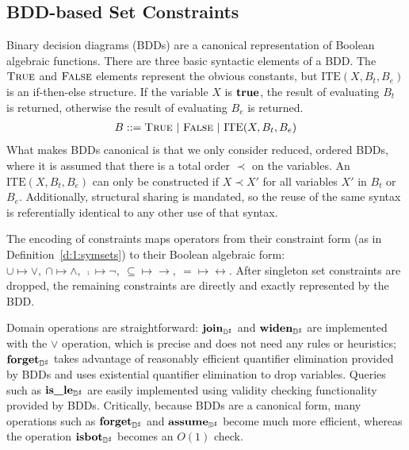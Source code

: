 \subsection{BDD-based Set Constraints}
\label{s:4:3:bdd}
Binary decision diagrams (BDDs) are a canonical representation of Boolean algebraic functions.  There are three basic syntactic elements of a BDD.  The $\textsc{True}$ and $\textsc{False}$ elements represent the obvious constants, but $\textrm{ITE}(X,B_t,B_e)$ is an if-then-else structure.  If the variable $X$ is $\mathbf{true}$, the result of evaluating $B_t$ is returned, otherwise the result of evaluating $B_e$ is returned.
\begin{align*}
  B ::= \textsc{True} \ | \ \textsc{False} \ | \ \textrm{ITE}(X,B_t,B_e)
\end{align*}
What makes BDDs canonical is that we only consider reduced, ordered BDDs, where it is assumed that there is a total order $\prec$ on the variables.  An $\textrm{ITE}(X,B_t,B_e)$ can only be constructed if $X \prec X'$ for all variables $X'$ in $B_t$ or $B_e$.  Additionally, structural sharing is mandated, so the reuse of the same syntax is referentially identical to any other use of that syntax.

The encoding of constraints maps operators from their constraint form (as in Definition~\ref{d:1:symsets}) to their Boolean algebraic form: $\cup \mapsto \vee, \ \cap \mapsto \wedge, \ \comp{} \mapsto \neg, \ \subseteq \mapsto \rightarrow, \ = \mapsto \leftrightarrow$. After singleton set constraints are dropped, the remaining constraints are directly and exactly represented by the BDD.  

Domain operations are straightforward: $\textbf{join}_{{\mathbb{D}}^{\sharp}}$ and $\textbf{widen}_{{\mathbb{D}}^{\sharp}}$ are implemented with the $\vee$ operation, which is precise and does not need any rules or heuristics; $\textbf{forget}_{{\mathbb{D}}^{\sharp}}$ takes advantage of reasonably efficient quantifier elimination provided by BDDs and uses existential quantifier elimination to drop variables.  Queries such as $\textbf{is\_le}_{{\mathbb{D}}^{\sharp}}$ are easily implemented using validity checking functionality provided by BDDs.  Critically, because BDDs are a canonical form, many operations such as $\textbf{forget}_{{\mathbb{D}}^{\sharp}}$ and $\textbf{assume}_{{\mathbb{D}}^{\sharp}}$ become much more efficient, whereas the operation $\textbf{isbot}_{{\mathbb{D}}^{\sharp}}$ becomes an $O(1)$ check.

